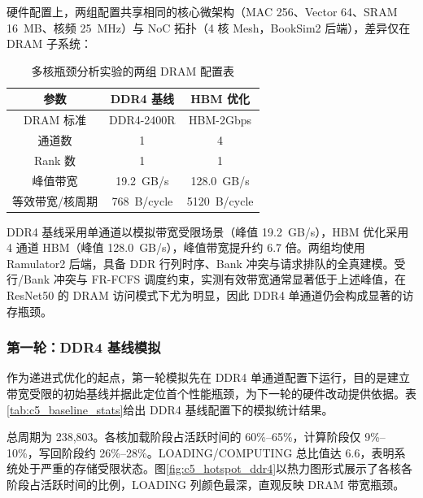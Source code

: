 硬件配置上，两组配置共享相同的核心微架构（MAC 256、Vector 64、SRAM \SI{16}{MB}、核频 \SI{25}{MHz}）与 NoC 拓扑（4 核 Mesh，BookSim2 后端），差异仅在 DRAM 子系统：

\begin{table}[H]
  \centering
  \caption{多核瓶颈分析实验的两组 DRAM 配置表}
  \label{tab:c5_dram_configs}
  \small
  \begin{tabular*}{\textwidth}{@{\extracolsep{\fill}}ccc}
    \toprule
    参数 & DDR4 基线 & HBM 优化 \\
    \midrule
    DRAM 标准      & DDR4-2400R  & HBM-2Gbps \\
    通道数         & 1           & 4 \\
    Rank 数        & 1           & 1 \\
    峰值带宽       & \SI{19.2}{GB/s}  & \SI{128.0}{GB/s} \\
    等效带宽/核周期 & \SI{768}{B/cycle} & \SI{5120}{B/cycle} \\
    \bottomrule
  \end{tabular*}
\end{table}

DDR4 基线采用单通道以模拟带宽受限场景（峰值 \SI{19.2}{GB/s}），HBM 优化采用 4 通道 HBM（峰值 \SI{128.0}{GB/s}），峰值带宽提升约 6.7 倍。两组均使用 Ramulator2 后端，具备 DDR 行列时序、Bank 冲突与请求排队的全真建模。受行/Bank 冲突与 FR-FCFS 调度约束，实测有效带宽通常显著低于上述峰值，在 ResNet50 的 DRAM 访问模式下尤为明显，因此 DDR4 单通道仍会构成显著的访存瓶颈。

\subsubsection{第一轮：DDR4 基线模拟}

作为递进式优化的起点，第一轮模拟先在 DDR4 单通道配置下运行，目的是建立带宽受限的初始基线并据此定位首个性能瓶颈，为下一轮的硬件改动提供依据。表\ref{tab:c5_baseline_stats}给出 DDR4 基线配置下的模拟统计结果。

总周期为 238,803。各核加载阶段占活跃时间的 60\%--65\%，计算阶段仅 9\%--10\%，写回阶段约 26\%--28\%。LOADING\allowbreak /COMPUTING \allowbreak 总比值达 6.6，表明系统处于严重的存储受限状态。图\ref{fig:c5_hotspot_ddr4}以热力图形式展示了各核各阶段占活跃时间的比例，LOADING 列颜色最深，直观反映 DRAM 带宽瓶颈。

